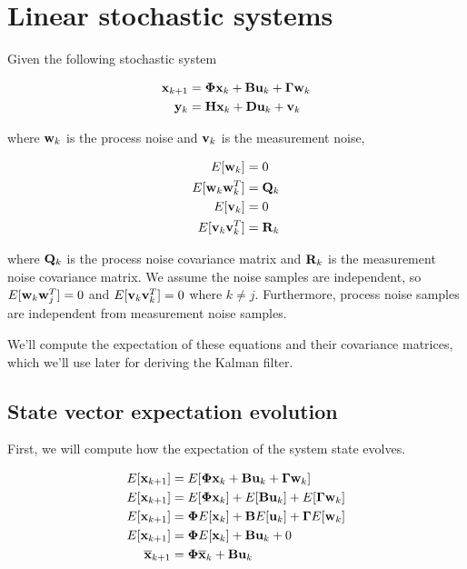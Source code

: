 \section{Linear stochastic systems}

Given the following stochastic system

\begin{align*}
  \mathbf{x}_{k+1} &= \mathbf{\Phi}\mathbf{x}_k + \mathbf{B}\mathbf{u}_k +
    \mathbf{\Gamma}\mathbf{w}_k \\
  \mathbf{y}_k &= \mathbf{H}\mathbf{x}_k + \mathbf{D}\mathbf{u}_k + \mathbf{v}_k
\end{align*}

where $\mathbf{w}_k$ is the process noise and $\mathbf{v}_k$ is the measurement noise,
 

\begin{align*}
  E[\mathbf{w}_k] &= 0 \\
  E[\mathbf{w}_k\mathbf{w}_k^T] &= \mathbf{Q}_k \\
  E[\mathbf{v}_k] &= 0 \\
  E[\mathbf{v}_k\mathbf{v}_k^T] &= \mathbf{R}_k
\end{align*}

where $\mathbf{Q}_k$ is the process noise covariance matrix and $\mathbf{R}_k$ is the
measurement noise covariance matrix. We assume the noise samples are
independent, so $E[\mathbf{w}_k\mathbf{w}_j^T] = 0$ and $E[\mathbf{v}_k\mathbf{v}_k^T] = 0$
where $k \neq j$. Furthermore, process noise samples are independent from
measurement noise samples.

We'll compute the expectation of these equations and their covariance matrices,
which we'll use later for deriving the Kalman filter.

\subsection{State vector expectation evolution}

First, we will compute how the expectation of the system state evolves.

\begin{align*}
  E[\mathbf{x}_{k+1}] &= E[\mathbf{\Phi}\mathbf{x}_k + \mathbf{B}\mathbf{u}_k +
    \mathbf{\Gamma}\mathbf{w}_k] \\
  E[\mathbf{x}_{k+1}] &= E[\mathbf{\Phi}\mathbf{x}_k] + E[\mathbf{B}\mathbf{u}_k] +
    E[\mathbf{\Gamma}\mathbf{w}_k] \\
  E[\mathbf{x}_{k+1}] &= \mathbf{\Phi}E[\mathbf{x}_k] + \mathbf{B}E[\mathbf{u}_k] +
    \mathbf{\Gamma}E[\mathbf{w}_k] \\
  E[\mathbf{x}_{k+1}] &= \mathbf{\Phi}E[\mathbf{x}_k] + \mathbf{B}\mathbf{u}_k + 0 \\
  \overline{\mathbf{x}}_{k+1} &= \mathbf{\Phi}\overline{\mathbf{x}}_k +
    \mathbf{B}\mathbf{u}_k \\
\end{align*}

